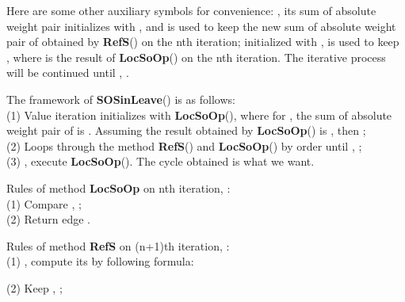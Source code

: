 \documentclass{acm_proc_article-sp}
\begin{document}
Here are some other auxiliary symbols for convenience: , its sum of absolute weight pair initializes with , and  is used to keep the new sum of absolute weight pair of  obtained by \textbf{RefS}() on the nth iteration;  initialized with , is used to keep , where  is the result of \textbf{LocSoOp}() on the nth iteration. The iterative process will be continued until , .

The framework of \textbf{SOSinLeave}() is as follows:\\
(1) Value iteration initializes with \textbf{LocSoOp}(), where for , the sum of absolute weight pair of  is . Assuming the result obtained by \textbf{LocSoOp}() is , then ;\\
(2) Loops through the method \textbf{RefS}() and \textbf{LocSoOp}() by order until , ;\\
(3) , execute \textbf{LocSoOp}(). The cycle obtained is what we want.

Rules of method \textbf{LocSoOp} on nth iteration, :\\
(1) Compare , ;\\
(2) Return edge .

Rules of method \textbf{RefS} on (n+1)th iteration, : \\
(1) , compute its   by following formula:

(2) Keep , ;
\end{document}
